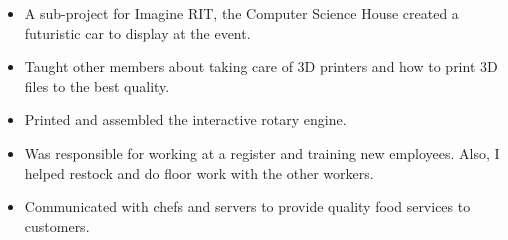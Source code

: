 \documentclass[10pt,a4paper]{altacv}
\begin{document}


\begin{itemize}
  \item A sub-project for Imagine RIT, the Computer Science House created a futuristic car to display at the event.
  \item Taught other members about taking care of 3D printers and how to print 3D files to the best quality. 
  \item Printed and assembled the interactive rotary engine.
  
\end{itemize}
\divider
%













\begin{itemize}
	\item Was responsible for working at a register and training new employees. Also, I helped restock and do floor work with the other workers. 
\end{itemize}
%


\begin{itemize}
	\item Communicated with chefs and servers to provide quality food services to customers.
\end{itemize}
%
\end{document}
